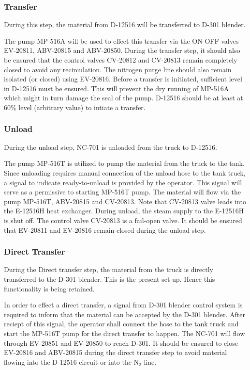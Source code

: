 \documentclass[a4paper,oneside]{article}
\begin{document}
\subsubsection{Transfer}
\label{sec:org9243021}
During this step, the material from D-12516 will be transferred to
D-301 blender. 

The pump MP-516A will be used to effect this transfer via the ON-OFF
valves EV-20811, ABV-20815 and ABV-20850. During the transfer step, it
should also be ensured that the control valves CV-20812 and CV-20813
remain completely closed to avoid any recirculation. The nitrogen
purge line should also remain isolated (or closed) using EV-20816.
Before a transfer is initiated, sufficient level in D-12516 must be
ensured. This will prevent the dry running of MP-516A which might in
turn damage the seal of the pump. D-12516 should be at least at 60\%
level (arbitrary value) to intiate a transfer.
\subsubsection{Unload}
\label{sec:org1c9c8e2}
During the unload step, NC-701 is unloaded from the truck to
D-12516. 

The pump MP-516T is utilized to pump the material from the truck to
the tank. Since unloading requires manual connection of the unload
hose to the tank truck, a signal to indicate ready-to-unload is
provided by the operator. This signal will serve as a permissive to
starting MP-516T pump. The material will flow via the pump MP-516T,
ABV-20815 and CV-20813. Note that CV-20813 valve leads into the
E-12516H heat exchanger. During unload, the steam supply to the
E-12516H is shut off. The control valve CV-20813 is a fail-open
valve. It should be ensured that EV-20811 and EV-20816 remain closed
during the unload step.
\subsubsection{Direct Transfer}
\label{sec:org113ec9c}
During the Direct transfer step, the material from the truck is
directly transferred to the D-301 blender. This is the present set
up. Hence this functionality is being retained.

In order to effect a direct transfer, a signal from D-301 blender
control system is required to inform that the material can be accepted
by the D-301 blender. After reciept of this signal, the operator shall
connect the hose to the tank truck and start the MP-516T pump for the
direct transfer to happen. The NC-701 will flow through EV-20851 and
EV-20850 to reach D-301. It should be ensured to close EV-20816 and
ABV-20815 during the direct transfer step to avoid material flowing
into the D-12516 circuit or into the N\(_{\text{2}}\) line.
\end{document}
